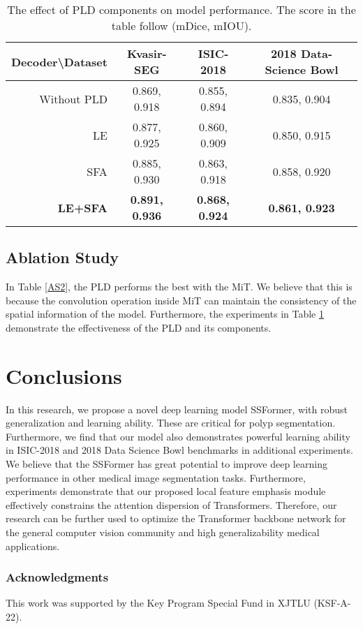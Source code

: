 \documentclass[runningheads]{llncs}
\begin{document}
\begin{table}[h]\scriptsize
\centering
\caption{The effect of PLD components on model performance. The score in the table follow (mDice, mIOU).}
\label{AS3}
\renewcommand\arraystretch{1.3}
\begin{tabular}{|r|c|c|c|}
\hline
\multicolumn{1}{|l|}{Decoder\textbackslash{}Dataset} & Kvasir-SEG            & ISIC-2018             & 2018 Data-Science Bowl \\ \hline
Without PLD                                          & 0.869, 0.918          & 0.855, 0.894          & 0.835, 0.904           \\ \hline
LE                                                   & 0.877, 0.925          & 0.860, 0.909          & 0.850, 0.915           \\ \hline
SFA                                                  & 0.885, 0.930          & 0.863, 0.918          & 0.858, 0.920           \\ \hline
\textbf{LE+SFA}                                      & \textbf{0.891, 0.936} & \textbf{0.868, 0.924} & \textbf{0.861, 0.923}  \\ \hline
\end{tabular}
\end{table}

\subsection{Ablation Study}\label{section:AS}

In Table \ref{AS2}, the PLD performs the best with the MiT. We believe that this is because the convolution operation inside MiT can maintain the consistency of the spatial information of the model. Furthermore, the experiments in Table \ref{AS3} demonstrate the effectiveness of the PLD and its components.





\section{Conclusions}
In this research, we propose a novel deep learning model SSFormer, with robust generalization and learning ability.  These are critical for polyp segmentation. Furthermore, we find that our model also demonstrates powerful learning ability in ISIC-2018 and 2018 Data Science Bowl benchmarks in additional experiments. We believe that the SSFormer has great potential to improve deep learning performance in other medical image segmentation tasks. Furthermore, experiments demonstrate that our proposed local feature emphasis module effectively constrains the attention dispersion of Transformers. Therefore, our research can be further used to optimize the Transformer backbone network for the general computer vision community and high generalizability medical applications.


\subsubsection{Acknowledgments}
This work was supported by the Key Program Special Fund in XJTLU (KSF-A-22).


\end{document}
